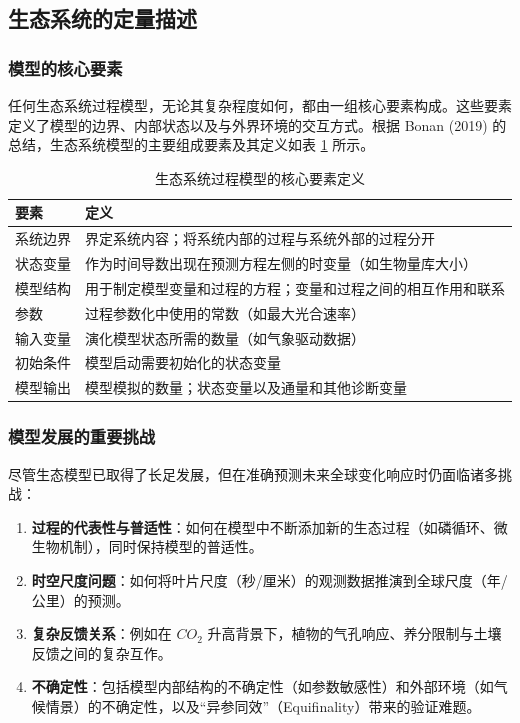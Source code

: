 \documentclass[10pt]{config}
\begin{document}
\subsection{生态系统的定量描述}

\subsubsection{模型的核心要素}
任何生态系统过程模型，无论其复杂程度如何，都由一组核心要素构成。这些要素定义了模型的边界、内部状态以及与外界环境的交互方式。根据 Bonan (2019) 的总结，生态系统模型的主要组成要素及其定义如表 \ref{tab:model_elements} 所示。

\begin{table}[h]
    \centering
    \caption{生态系统过程模型的核心要素定义}
    \label{tab:model_elements}
    \small
    \renewcommand{\arraystretch}{1.3}
    \begin{tabular}{p{3cm} p{11cm}}
        \toprule
        \textbf{要素} & \textbf{定义} \\
        \midrule
        系统边界 & 界定系统内容；将系统内部的过程与系统外部的过程分开 \\
        状态变量 & 作为时间导数出现在预测方程左侧的时变量（如生物量库大小） \\
        模型结构 & 用于制定模型变量和过程的方程；变量和过程之间的相互作用和联系 \\
        参数 & 过程参数化中使用的常数（如最大光合速率） \\
        输入变量 & 演化模型状态所需的数量（如气象驱动数据） \\
        初始条件 & 模型启动需要初始化的状态变量 \\
        模型输出 & 模型模拟的数量；状态变量以及通量和其他诊断变量 \\
        \bottomrule
    \end{tabular}
\end{table}

\subsubsection{模型发展的重要挑战}

尽管生态模型已取得了长足发展，但在准确预测未来全球变化响应时仍面临诸多挑战：
\begin{enumerate}
    \item \textbf{过程的代表性与普适性}：如何在模型中不断添加新的生态过程（如磷循环、微生物机制），同时保持模型的普适性。
    \item \textbf{时空尺度问题}：如何将叶片尺度（秒/厘米）的观测数据推演到全球尺度（年/公里）的预测。
    \item \textbf{复杂反馈关系}：例如在 $CO_2$ 升高背景下，植物的气孔响应、养分限制与土壤反馈之间的复杂互作。
    \item \textbf{不确定性}：包括模型内部结构的不确定性（如参数敏感性）和外部环境（如气候情景）的不确定性，以及“异参同效”（Equifinality）带来的验证难题。
\end{enumerate}
\end{document}
